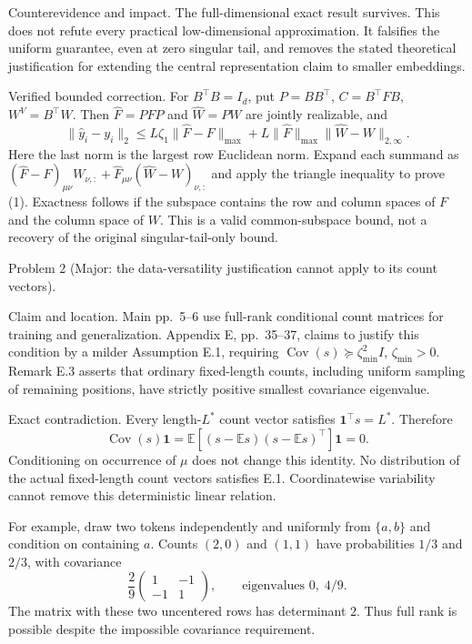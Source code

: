 \documentclass[10pt]{article}
\begin{document}
Counterevidence and impact. The full-dimensional exact result survives. This does not refute every practical low-dimensional approximation. It falsifies the uniform guarantee, even at zero singular tail, and removes the stated theoretical justification for extending the central representation claim to smaller embeddings.\par
Verified bounded correction. For \(B^\top B=I_d\), put \(P=BB^\top\), \(C=B^\top FB\), \(W^V=B^\top W\). Then \(\widehat F=PFP\) and \(\widehat W=PW\) are jointly realizable, and \[\|\widehat y_i-y_i\|_2
 \le L\zeta_1\|\widehat F-F\|_{\max}
   +L\|\widehat F\|_{\max}\|\widehat W-W\|_{2,\infty}.
 \tag{1}\] Here the last norm is the largest row Euclidean norm. Expand each summand as \((\widehat F-F)_{\mu\nu}W_{\nu,:}
+\widehat F_{\mu\nu}(\widehat W-W)_{\nu,:}\) and apply the triangle inequality to prove (1). Exactness follows if the subspace contains the row and column spaces of \(F\) and the column space of \(W\). This is a valid common-subspace bound, not a recovery of the original singular-tail-only bound.\par
Problem 2 (Major: the data-versatility justification cannot apply to its count vectors).\par
Claim and location. Main pp. 5–6 use full-rank conditional count matrices for training and generalization. Appendix E, pp. 35–37, claims to justify this condition by a milder Assumption E.1, requiring \(\operatorname{Cov}(s)\succeq\zeta_{\min}^2 I\), \(\zeta_{\min}>0\). Remark E.3 asserts that ordinary fixed-length counts, including uniform sampling of remaining positions, have strictly positive smallest covariance eigenvalue.\par
Exact contradiction. Every length-\(L^*\) count vector satisfies \(\mathbf1^\top s=L^*\). Therefore \[\operatorname{Cov}(s)\mathbf1
 =\mathbb E[(s-\mathbb Es)(s-\mathbb Es)^\top]\mathbf1=0.\] Conditioning on occurrence of \(\mu\) does not change this identity. No distribution of the actual fixed-length count vectors satisfies E.1. Coordinatewise variability cannot remove this deterministic linear relation.\par
For example, draw two tokens independently and uniformly from \(\{a,b\}\) and condition on containing \(a\). Counts \((2,0)\) and \((1,1)\) have probabilities \(1/3\) and \(2/3\), with covariance \[\frac29\begin{pmatrix}1&-1\\-1&1\end{pmatrix},
 \qquad \text{eigenvalues }0,\;4/9.\] The matrix with these two uncentered rows has determinant \(2\). Thus full rank is possible despite the impossible covariance requirement.\par
\end{document}
